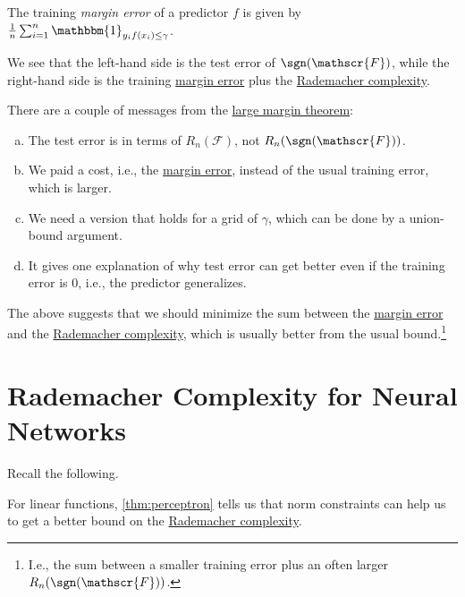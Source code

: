 \begin{notation}\label{not:margin-error}
	The training \emph{margin error} of a predictor \(f\) is given by \(\frac{1}{n} \sum_{i=1}^{n} \mathbbm{1}_{y_i f(x_i) \leq \gamma } \).
\end{notation}

We see that the left-hand side is the test error of \(\sgn (\mathscr{F} )\), while the right-hand side is the training \hyperref[not:margin-error]{margin error} plus the \hyperref[def:Rademacher-complexity]{Rademacher complexity}.

\begin{note}
	There are a couple of messages from the \hyperref[thm:large-margin]{large margin theorem}:
	\begin{enumerate}[(a)]
		\item The test error is in terms of \(R_n(\mathscr{F} )\), not \(R_n(\sgn (\mathscr{F} ))\).
		\item We paid a cost, i.e., the \hyperref[not:margin-error]{margin error}, instead of the usual training error, which is larger.
		\item We need a version that holds for a grid of \(\gamma \), which can be done by a union-bound argument.
		\item It gives one explanation of why test error can get better even if the training error is \(0\), i.e., the predictor generalizes.
	\end{enumerate}
\end{note}

\begin{intuition}
	The above suggests that we should minimize the sum between the \hyperref[not:margin-error]{margin error} and the \hyperref[def:Rademacher-complexity]{Rademacher complexity}, which is usually better from the usual bound.\footnote{I.e., the sum between a smaller training error plus an often larger \(R_n(\sgn (\mathscr{F} ))\).}
\end{intuition}

\section{Rademacher Complexity for Neural Networks}
Recall the following.

\begin{prev}
	For linear functions, \autoref{thm:perceptron} tells us that norm constraints can help us to get a better bound on the \hyperref[def:Rademacher-complexity]{Rademacher complexity}.
\end{prev}


